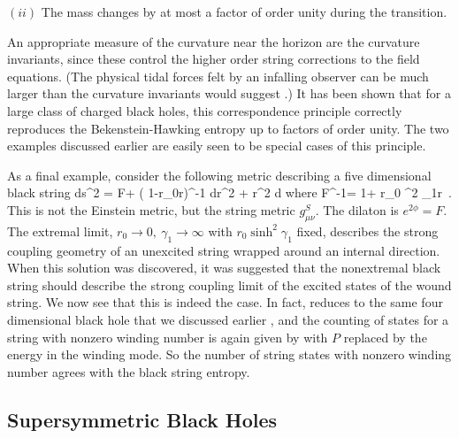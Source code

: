 $(ii)$ The mass changes by at most a factor of order unity during the
transition.

\noindent An appropriate measure of the curvature near the horizon are the
curvature invariants, since these control the higher order string corrections
to the field equations. 
(The physical tidal forces felt by an infalling observer can be
much larger than the curvature invariants would suggest \cite{horo}.) 
It has been shown \cite{hopo} that for a large class of charged black holes, 
this
correspondence principle correctly reproduces the Bekenstein-Hawking entropy 
up to factors of order unity. The two examples discussed earlier are easily
seen to be special cases of this principle. 

As a final example, consider
the following metric describing a five dimensional  black string 
\cite{host1}
\eq{}
ds^2 = F
+ \left( 1-{r_0\over r}\right)^{-1} dr^2 + r^2 d\Omega
\eqe
where
\eq
F^{-1}= 1+ {r_0 \sinh^2 \gamma_1\over r}\ .
\eqe
This is not the Einstein metric, but the string metric $g^S_{\mu\nu}$.
The dilaton is $e^{2\phi} = F$.
The extremal limit, $r_0 \rightarrow 0,   \ \gamma_1 \rightarrow \infty$ with
$r_0 \sinh^2 \gamma_1$ fixed, describes the strong coupling geometry of
an unexcited string wrapped around
an internal
direction. 
When this solution was discovered, it was suggested that
the nonextremal black string should describe the strong coupling limit
of the excited states of the wound string. We now see that this is indeed
the case. In fact, 
reduces to the same four dimensional black hole 
that we discussed earlier ,
and the counting of states for a string with
nonzero winding number is
again given by  with $P$ replaced by the energy in the
winding mode. So the number of string states 
with nonzero winding number agrees with the black string
entropy.





\subsection{Supersymmetric Black Holes}

